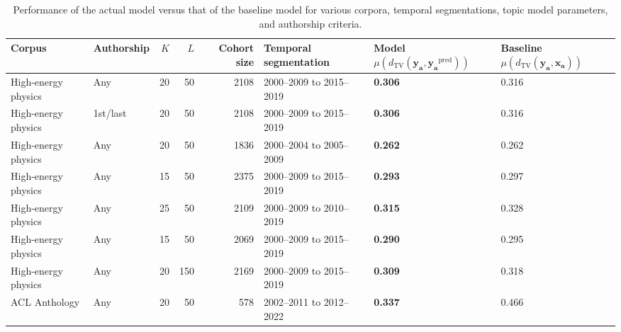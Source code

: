 \begin{table}
\caption{Performance of the actual model versus that of the baseline model for various corpora, temporal segmentations, topic model parameters, and authorship criteria.}
\label{table:performance}
\begin{tabular}{llrrrlll}
\toprule
Corpus & Authorship & $K$ & $L$ & Cohort size & Temporal segmentation & Model\newline $\mu(d_{{\mathrm{{TV}}}}(\bm{{y_{{a}}}}, \bm{{y_{{a}}}}^{{\text{{pred}}}}))$ & Baseline\newline $\mu(d_{{\mathrm{{TV}}}}(\bm{{y_{{a}}}}, \bm{{x_{{a}}}}))$ \\
\midrule
High-energy physics & Any & 20 & 50 & 2108 & 2000--2009 to 2015--2019 & \textbf{0.306} & 0.316 \\
High-energy physics & 1st/last & 20 & 50 & 2108 & 2000--2009 to 2015--2019 & \textbf{0.306} & 0.316 \\
High-energy physics & Any & 20 & 50 & 1836 & 2000--2004 to 2005--2009 & \textbf{0.262} & 0.262 \\
High-energy physics & Any & 15 & 50 & 2375 & 2000--2009 to 2015--2019 & \textbf{0.293} & 0.297 \\
High-energy physics & Any & 25 & 50 & 2109 & 2000--2009 to 2010--2019 & \textbf{0.315} & 0.328 \\
High-energy physics & Any & 15 & 50 & 2069 & 2000--2009 to 2015--2019 & \textbf{0.290} & 0.295 \\
High-energy physics & Any & 20 & 150 & 2169 & 2000--2009 to 2015--2019 & \textbf{0.309} & 0.318 \\
ACL Anthology & Any & 20 & 50 & 578 & 2002--2011 to 2012--2022 & \textbf{0.337} & 0.466 \\
\bottomrule
\end{tabular}
\end{table}
